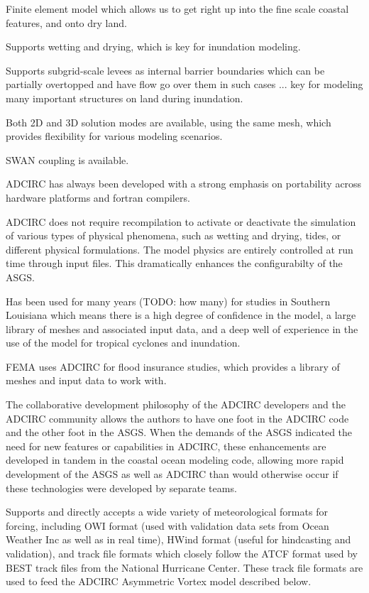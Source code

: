 \documentclass[jmse,article,submit,moreauthors,pdftex,12pt,a4paper]{mdpi}
\begin{document}
Finite element model which allows us to get right up into the fine 
scale coastal features, and onto dry land. 

Supports wetting and drying, which is key for inundation modeling.

Supports subgrid-scale levees as internal barrier boundaries which 
can be partially overtopped and have flow go over them in such cases 
... key for modeling many important structures on land during 
inundation. 

Both 2D and 3D solution modes are available, using the same mesh, 
which provides flexibility for various modeling scenarios. 

SWAN coupling is available. 


ADCIRC has always been developed with a strong emphasis on 
portability across hardware platforms and fortran compilers.

ADCIRC does not require recompilation to activate or deactivate the 
simulation of various types of physical phenomena, such as wetting 
and drying, tides, or different physical formulations. The model 
physics are entirely controlled at run time through input files. 
This dramatically enhances the configurabilty of the ASGS. 

Has been used for many years (TODO: how many) for studies in 
Southern Louisiana which means there is a high degree of confidence 
in the model, a large library of meshes and associated input data, 
and a deep well of experience in the use of the model for tropical 
cyclones and inundation. 

FEMA uses ADCIRC for flood insurance studies, which provides a library
of meshes and input data to work with.

The collaborative development philosophy of the ADCIRC developers
and the ADCIRC community allows the authors to have one foot in the
ADCIRC code and the other foot in the ASGS. When the demands of the
ASGS indicated the need for new features or capabilities in ADCIRC, 
these enhancements are developed in tandem in the coastal ocean modeling
code, allowing more rapid development of the ASGS as well as ADCIRC
than would otherwise occur if these technologies were developed by
separate teams. 

Supports and directly accepts a wide variety of meteorological 
formats for forcing, including OWI format (used with validation data 
sets from Ocean Weather Inc as well as in real time), HWind format 
(useful for hindcasting and validation), and track file formats which
closely follow the ATCF format used by BEST track files from the 
National Hurricane Center. These track file formats are used to feed
the ADCIRC Asymmetric Vortex model described below. 
\end{document}

